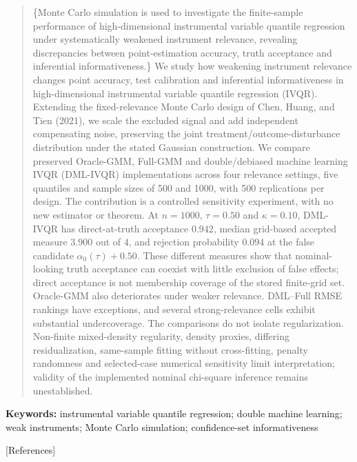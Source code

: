 \maketitle
\begin{abstract}
\{Monte Carlo simulation is used to investigate the finite-sample performance of high-dimensional instrumental variable quantile regression under systematically weakened instrument relevance, revealing discrepancies between point-estimation accuracy, truth acceptance and inferential informativeness.\}
We study how weakening instrument relevance changes point accuracy, test calibration and inferential informativeness in high-dimensional instrumental variable quantile regression (IVQR). Extending the fixed-relevance Monte Carlo design of Chen, Huang, and Tien (2021), we scale the excluded signal and add independent compensating noise, preserving the joint treatment/outcome-disturbance distribution under the stated Gaussian construction. We compare preserved Oracle-GMM, Full-GMM and double/debiased machine learning IVQR (DML-IVQR) implementations across four relevance settings, five quantiles and sample sizes of 500 and 1000, with 500 replications per design. The contribution is a controlled sensitivity experiment, with no new estimator or theorem. At $n=1000$, $\tau=0.50$ and $\kappa=0.10$, DML-IVQR has direct-at-truth acceptance $0.942$, median grid-based accepted measure $3.900$ out of $4$, and rejection probability $0.094$ at the false candidate $\alpha_0(\tau)+0.50$. These different measures show that nominal-looking truth acceptance can coexist with little exclusion of false effects; direct acceptance is not membership coverage of the stored finite-grid set. Oracle-GMM also deteriorates under weaker relevance. DML--Full RMSE rankings have exceptions, and several strong-relevance cells exhibit substantial undercoverage. The comparisons do not isolate regularization. Non-finite mixed-density regularity, density proxies, differing residualization, same-sample fitting without cross-fitting, penalty randomness and selected-case numerical sensitivity limit interpretation; validity of the implemented nominal chi-square inference remains unestablished.
\end{abstract}
\noindent\textbf{Keywords:} instrumental variable quantile regression; double machine learning; weak instruments; Monte Carlo simulation; confidence-set informativeness
\label{w3:main-start}







\label{w3:main-end}


\FloatBarrier
\par\vspace{3\baselineskip}
\label{w3:references-start}
\begingroup
{}[References]{\par\nobreak\vspace{\baselineskip}}
\printbibliography[title={References}]
\endgroup
\clearpage
\appendix
\label{w3:appendices-start}
